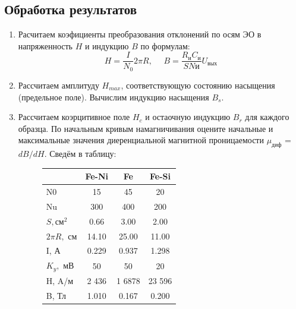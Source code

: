 \documentclass[14pt,a4paper]{article}
\begin{document}
\subsection*{Обработка результатов}
\begin{enumerate}
  \item Расчитаем коэфициенты преобразования отклонений по осям ЭО в напряженность $H$ и индукцию $B$ по формулам:
  $$H = \frac{I}{N_0}{2\pi R}, \ \ \ \ \ \ B = \frac{R_\text{и}C_\text{и}}{SN\text{и}}U_\text{вых}$$
  \item Рассчитаем амплитуду
  $H_{max}$, соответствующую состоянию насыщения (предельное поле). Вычислим индукцию насыщения $B_s$.
  \item Рассчитаем коэрцитивное поле $H_c$ и остаочную индукцию $B_r$ для каждого образца. По начальным кривым намагничивания оцените начальные и максимальные
значения диеренциальной магнитной проницаемости $\mu_\text{диф}$ = $dB/dH$.
  Сведём в таблицу:
  \begin{figure}[H]
    \begin{tabular}{l|ccc}
      {} &        Fe-Ni &            Fe &         Fe-Si \\
      \midrule
      N0  &    15 &     45 &     20 \\
      Nu  &   300 &    400 &    200 \\
      $S, \text{см}^2$   &     0.66 &      3.00 &      2.00 \\
      $2\pi R,$ см &     14.10 &      25.00 &      11.00 \\
      I, А   &     0.229 &      0.937 &      1.298 \\
      $K_y,$ мВ  &     50 &      50 &      20 \\
      H, A/м   &  2 436 &  1 6878 &  23 596 \\
      B, Тл   &     1.010 &      0.167 &      0.200 \\
      \end{tabular}
  \end{figure}
\end{enumerate}
\end{document}

